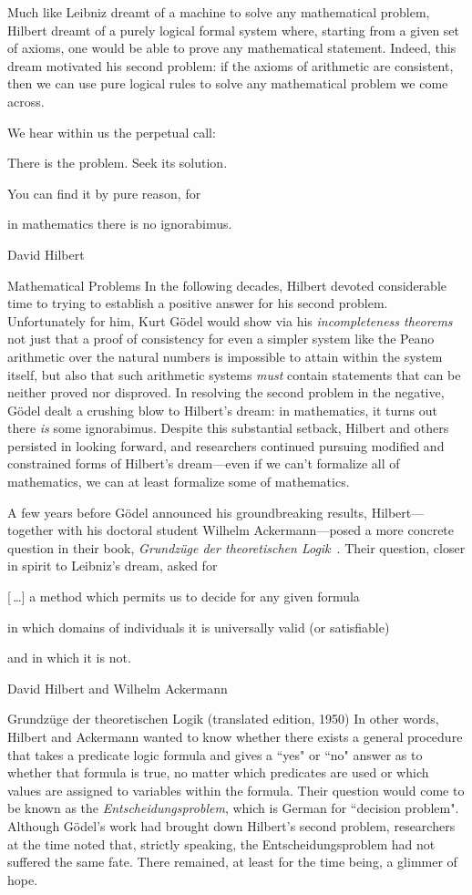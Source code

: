 Much like Leibniz dreamt of a machine to solve any mathematical problem, Hilbert dreamt of a purely logical formal system where, starting from a given set of axioms, one would be able to prove any mathematical statement. Indeed, this dream motivated his second problem: if the axioms of arithmetic are consistent, then we can use pure logical rules to solve any mathematical problem we come across.\par
\epigraph{We hear within us the perpetual call:\par
There is the problem. Seek its solution.\par
You can find it by pure reason, for\par
in mathematics there is no ignorabimus.}{David Hilbert}{Mathematical Problems}{}
\vspace{1em}
\noindent
In the following decades, Hilbert devoted considerable time to trying to establish a positive answer for his second problem. Unfortunately for him, Kurt G\"{o}del would show via his \emph{incompleteness theorems}~\citeyearpar{Godel1931UberFormalUnentscheidbare} not just that a proof of consistency for even a simpler system like the Peano arithmetic over the natural numbers is impossible to attain within the system itself, but also that such arithmetic systems \emph{must} contain statements that can be neither proved nor disproved. In resolving the second problem in the negative, G\"{o}del dealt a crushing blow to Hilbert's dream: in mathematics, it turns out there \emph{is} some ignorabimus. Despite this substantial setback, Hilbert and others persisted in looking forward, and researchers continued pursuing modified and constrained forms of Hilbert's dream---even if we can't formalize all of mathematics, we can at least formalize some of mathematics.

A few years before G\"{o}del announced his groundbreaking results, Hilbert---together with his doctoral student Wilhelm Ackermann---posed a more concrete question in their book, \textit{Grundz\"{u}ge der theoretischen Logik}~\citeyearpar{HilbertAckermann1928Grundzuge}. Their question, closer in spirit to Leibniz's dream, asked for\par
\epigraph{\textup{[\,\dots]} a method which permits us to decide for any given formula\par
in which domains of individuals it is universally valid (or satisfiable)\par
and in which it is not.}{David Hilbert and Wilhelm Ackermann}{Grundz\"{u}ge der theoretischen Logik (translated edition, 1950)}{}
\vspace{1em}
\noindent
In other words, Hilbert and Ackermann wanted to know whether there exists a general procedure that takes a predicate logic formula and gives a ``yes" or ``no" answer as to whether that formula is true, no matter which predicates are used or which values are assigned to variables within the formula. Their question would come to be known as the \emph{Entscheidungsproblem}, which is German for ``decision problem". Although G\"{o}del's work had brought down Hilbert's second problem, researchers at the time noted that, strictly speaking, the Entscheidungsproblem had not suffered the same fate. There remained, at least for the time being, a glimmer of hope.

